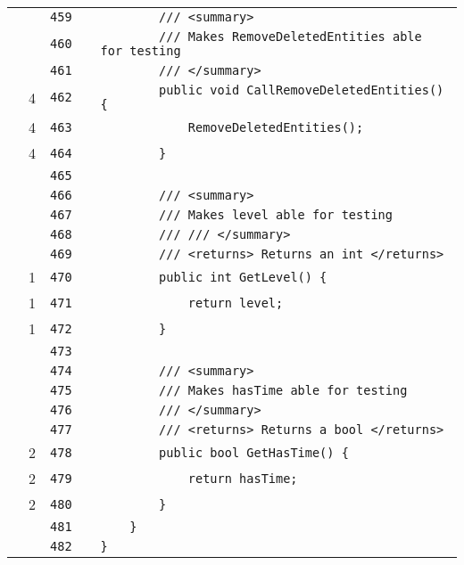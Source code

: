 \documentclass[a4paper,landscape,10pt]{article}
\begin{document}
\begin{longtable}[l]{lrrll}
\cellcolor{gray} &  & \verb~459~ & & \verb~        /// <summary>~\\
\cellcolor{gray} &  & \verb~460~ & & \verb~        /// Makes RemoveDeletedEntities able for testing~\\
\cellcolor{gray} &  & \verb~461~ & & \verb~        /// </summary>~\\
\cellcolor{green} & 4 & \verb~462~ & & \verb~        public void CallRemoveDeletedEntities() {~\\
\cellcolor{green} & 4 & \verb~463~ & & \verb~            RemoveDeletedEntities();~\\
\cellcolor{green} & 4 & \verb~464~ & & \verb~        }~\\
\cellcolor{gray} &  & \verb~465~ & & \verb~~\\
\cellcolor{gray} &  & \verb~466~ & & \verb~        /// <summary>~\\
\cellcolor{gray} &  & \verb~467~ & & \verb~        /// Makes level able for testing~\\
\cellcolor{gray} &  & \verb~468~ & & \verb~        /// /// </summary>~\\
\cellcolor{gray} &  & \verb~469~ & & \verb~        /// <returns> Returns an int </returns>~\\
\cellcolor{green} & 1 & \verb~470~ & & \verb~        public int GetLevel() {~\\
\cellcolor{green} & 1 & \verb~471~ & & \verb~            return level;~\\
\cellcolor{green} & 1 & \verb~472~ & & \verb~        }~\\
\cellcolor{gray} &  & \verb~473~ & & \verb~~\\
\cellcolor{gray} &  & \verb~474~ & & \verb~        /// <summary>~\\
\cellcolor{gray} &  & \verb~475~ & & \verb~        /// Makes hasTime able for testing~\\
\cellcolor{gray} &  & \verb~476~ & & \verb~        /// </summary>~\\
\cellcolor{gray} &  & \verb~477~ & & \verb~        /// <returns> Returns a bool </returns>~\\
\cellcolor{green} & 2 & \verb~478~ & & \verb~        public bool GetHasTime() {~\\
\cellcolor{green} & 2 & \verb~479~ & & \verb~            return hasTime;~\\
\cellcolor{green} & 2 & \verb~480~ & & \verb~        }~\\
\cellcolor{gray} &  & \verb~481~ & & \verb~    }~\\
\cellcolor{gray} &  & \verb~482~ & & \verb~}~\\
\end{longtable}
\newpage
\end{document}
